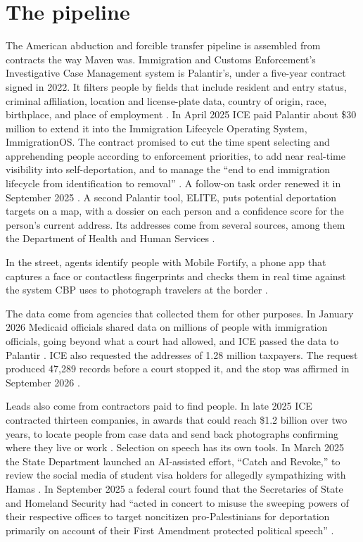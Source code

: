 \section{The pipeline}
\label{sec:11.1}
The American abduction and forcible transfer pipeline is assembled from contracts the way Maven was. Immigration and Customs Enforcement's Investigative Case Management system is Palantir's, under a five-year contract signed in 2022. It filters people by fields that include resident and entry status, criminal affiliation, location and license-plate data, country of origin, race, birthplace, and place of employment \autocite{Koebler2025ICM}. In April 2025 ICE paid Palantir about \$30 million to extend it into the Immigration Lifecycle Operating System, ImmigrationOS. The contract promised to cut the time spent selecting and apprehending people according to enforcement priorities, to add near real-time visibility into self-deportation, and to manage the “end to end immigration lifecycle from identification to removal” \autocite{Ho2025ImmigrationOS,Hubbard2025ImmigrationOS}. A follow-on task order renewed it in September 2025 \autocite{Jamison2025ImmigrationOSTaskOrder}. A second Palantir tool, ELITE, puts potential deportation targets on a map, with a dossier on each person and a confidence score for the person's current address. Its addresses come from several sources, among them the Department of Health and Human Services \autocite{Cox2026ELITE}.

In the street, agents identify people with Mobile Fortify, a phone app that captures a face or contactless fingerprints and checks them in real time against the system CBP uses to photograph travelers at the border \autocite{Cox2025MobileFortify}.

The data come from agencies that collected them for other purposes. In January 2026 Medicaid officials shared data on millions of people with immigration officials, going beyond what a court had allowed, and ICE passed the data to Palantir \autocite{JoffeBlock2026MedicaidPalantir}. ICE also requested the addresses of 1.28 million taxpayers. The request produced 47,289 records before a court stopped it, and the stop was affirmed in September 2026 \autocite{Shaw2026IRSICE}.

Leads also come from contractors paid to find people. In late 2025 ICE contracted thirteen companies, in awards that could reach \$1.2 billion over two years, to locate people from case data and send back photographs confirming where they live or work \autocite{Biddle2025BountyHunters,Hubbard2026SkipTracing}. Selection on speech has its own tools. In March 2025 the State Department launched an AI-assisted effort, “Catch and Revoke,” to review the social media of student visa holders for allegedly sympathizing with Hamas \autocite{Caputo2025CatchRevoke}. In September 2025 a federal court found that the Secretaries of State and Homeland Security had “acted in concert to misuse the sweeping powers of their respective offices to target noncitizen pro-Palestinians for deportation primarily on account of their First Amendment protected political speech” \autocite{aaup2025}.

